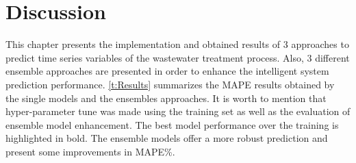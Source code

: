 \section{Discussion}
\label{s:Contribution-2-Summary}

This chapter presents the implementation and obtained results of 3 approaches to predict time series variables of the wastewater treatment process. Also, 3 different ensemble approaches are presented in order to enhance the intelligent system prediction performance.
\autoref{t:Results} summarizes the \ac{MAPE} results obtained by the single models and the ensembles approaches. It is worth to mention that hyper-parameter tune was made using the training set as well as the evaluation of ensemble model enhancement. The best model performance over the training is highlighted in bold. The ensemble models offer a more robust prediction and present some improvements in \ac{MAPE}\%.

